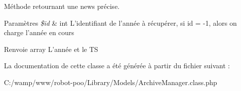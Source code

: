 Méthode retournant une news précise. 
\begin{DoxyParams}{Paramètres}
{\em \$id} & int L'identifiant de l'année à récupérer, si id = -\/1, alors on charge l'année en cours \\
\hline
\end{DoxyParams}
\begin{DoxyReturn}{Renvoie}
array L'année et le T\+S 
\end{DoxyReturn}


La documentation de cette classe a été générée à partir du fichier suivant \+:\begin{DoxyCompactItemize}
\item 
C\+:/wamp/www/robot-\/poo/\+Library/\+Models/Archive\+Manager.\+class.\+php\end{DoxyCompactItemize}
